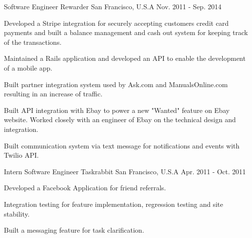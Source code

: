 \begin{cventries}
  \cventry
    {Software Engineer}
    {Rewarder}
    {San Francisco, U.S.A}
    {Nov. 2011 - Sep. 2014}
    {
      \begin{cvitems}
        \item {Developed a Stripe integration for securely accepting customers credit card payments and built a balance management and cash out system for keeping track of the transactions.}
        \item {Maintained a Rails application and developed an API to enable the development of a mobile app.}
        \item {Built partner integration system used by Ask.com and ManualsOnline.com resulting in an increase of traffic.}
        \item {Built API integration with Ebay to power a new "Wanted" feature on Ebay website. Worked closely with an engineer of Ebay on the technical design and integration.}
        \item{Built communication system via text message for notifications and events with Twilio API.}
      \end{cvitems}
    }
    
  \cventry
    {Intern Software Engineer}
    {Taskrabbit}
    {San Francisco, U.S.A}
    {Apr. 2011 - Oct. 2011}
    {
      \begin{cvitems}
        \item {Developed a Facebook Application for friend referrals.}
        \item{Integration testing for feature implementation, regression testing and site stability.}
        \item{Built a messaging feature for task clarification.}
      \end{cvitems}
    }
\end{cventries}
